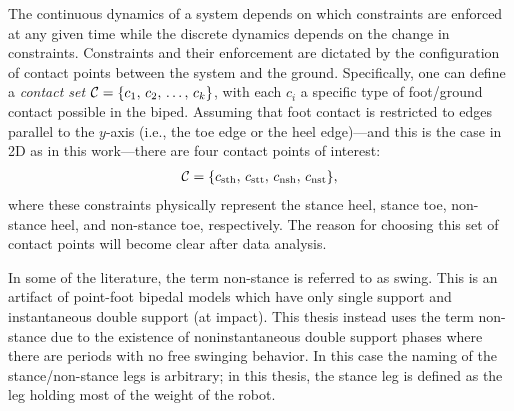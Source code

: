 The continuous dynamics of a system depends on which constraints are enforced at
any given time while the discrete dynamics depends on the change in
constraints.
%
Constraints and their enforcement are dictated by the configuration of contact
points between the system and the ground.
%
Specifically, one can define a {\em contact set} $\mathcal{C} = \{c_{1}, \, c_{2}, \,
\ldots, \, c_{k}\}$, with each $c_{i}$ a specific type of foot/ground contact
possible in the biped.
%
Assuming that foot contact is restricted to edges parallel to the $y$-axis
(i.e., the toe edge or the heel edge)---and this is the case in 2D as in this
work---there are four contact points of interest:
\begin{align*}
  \mathcal{C} =  \{c_{\mathrm{sth}}, \, c_{\mathrm{stt}}, \, c_{\mathrm{nsh}}, \, c_{\mathrm{nst}}\},
\end{align*}
where these constraints physically represent the stance heel, stance toe,
non-stance heel, and non-stance toe, respectively.
%
The reason for choosing this set of contact points will become clear after data
analysis.

\begin{remark}
  In some of the literature, the term non-stance is referred to as swing.
  This is an artifact of point-foot bipedal models which have only single
  support and instantaneous double support (at impact).
  This thesis instead uses the term non-stance due to the existence of
  noninstantaneous double support phases where there are periods with no free
  swinging behavior.
  In this case the naming of the stance/non-stance legs is arbitrary;
  in this thesis, the stance leg is defined as the leg holding most of the
  weight of the robot.
\end{remark}



